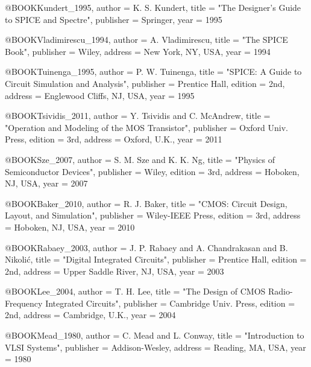 \documentclass[conference]{IEEEtran}
\begin{document}
@BOOK{Kundert_1995,
    author      =   {K. S. {Kundert}},
    title       =   "{The Designer's Guide to {SPICE} and Spectre}",
    publisher   =   {Springer},
    year        =   {1995}
}

@BOOK{Vladimirescu_1994,
    author      =   {A. {Vladimirescu}},
    title       =   "{The {SPICE} Book}",
    publisher   =   {Wiley},
    address     =   {New York, NY, USA},
    year        =   {1994}
}

@BOOK{Tuinenga_1995,
    author      =   {P. W. {Tuinenga}},
    title       =   "{SPICE: A Guide to Circuit Simulation and Analysis}",
    publisher   =   {Prentice Hall},
    edition     =   {2nd},
    address     =   {Englewood Cliffs, NJ, USA},
    year        =   {1995}
}

@BOOK{Tsividis_2011,
    author      =   {Y. {Tsividis} and C. {McAndrew}},
    title       =   "{Operation and Modeling of the {MOS} Transistor}",
    publisher   =   {Oxford Univ. Press},
    edition     =   {3rd},
    address     =   {Oxford, U.K.},
    year        =   {2011}
}

@BOOK{Sze_2007,
    author      =   {S. M. {Sze} and K. K. {Ng}},
    title       =   "{Physics of Semiconductor Devices}",
    publisher   =   {Wiley},
    edition     =   {3rd},
    address     =   {Hoboken, NJ, USA},
    year        =   {2007}
}

@BOOK{Baker_2010,
    author      =   {R. J. {Baker}},
    title       =   "{CMOS: Circuit Design, Layout, and Simulation}",
    publisher   =   {Wiley-IEEE Press},
    edition     =   {3rd},
    address     =   {Hoboken, NJ, USA},
    year        =   {2010}
}

@BOOK{Rabaey_2003,
    author      =   {J. P. {Rabaey} and A. {Chandrakasan} and B. {Nikoli\'c}},
    title       =   "{Digital Integrated Circuits}",
    publisher   =   {Prentice Hall},
    edition     =   {2nd},
    address     =   {Upper Saddle River, NJ, USA},
    year        =   {2003}
}

@BOOK{Lee_2004,
    author      =   {T. H. {Lee}},
    title       =   "{The Design of {CMOS} Radio-Frequency Integrated Circuits}",
    publisher   =   {Cambridge Univ. Press},
    edition     =   {2nd},
    address     =   {Cambridge, U.K.},
    year        =   {2004}
}

@BOOK{Mead_1980,
    author      =   {C. {Mead} and L. {Conway}},
    title       =   "{Introduction to {VLSI} Systems}",
    publisher   =   {Addison-Wesley},
    address     =   {Reading, MA, USA},
    year        =   {1980}
}
\end{document}
